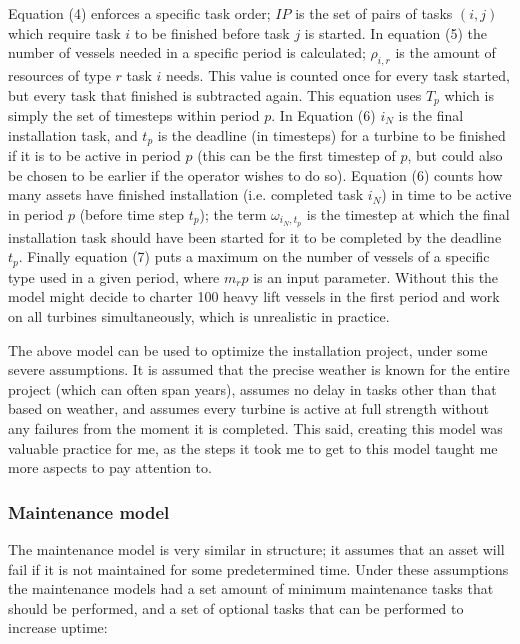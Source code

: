 \documentclass[a4paper,12pt]{article}
\begin{document}
Equation (4) enforces a specific task order; $IP$ is the set of pairs of tasks $(i, j)$ which require task $i$ to be finished before task $j$ is started. In equation (5) the number of vessels needed in a specific period is calculated; $\rho_{i,r}$ is the amount of resources of type $r$ task $i$ needs. This value is counted once for every task started, but every task that finished is subtracted again. This equation uses $T_p$ which is simply the set of timesteps within period $p$. In Equation (6) $i_N$ is the final installation task, and $t_p$ is the deadline (in timesteps) for a turbine to be finished if it is to be active in period $p$ (this can be the first timestep of $p$, but could also be chosen to be earlier if the operator wishes to do so). Equation (6) counts how many assets have finished installation (i.e. completed task $i_N$) in time to be active in period $p$ (before time step $t_p$); the term $\omega_{i_N,t_p}$ is the timestep at which the final installation task should have been started for it to be completed by the deadline $t_p$. Finally equation (7) puts a maximum on the number of vessels of a specific type used in a given period, where $m_rp$ is an input parameter. Without this the model might decide to charter 100 heavy lift vessels in the first period and work on all turbines simultaneously, which is unrealistic in practice. 

\bigskip

The above model can be used to optimize the installation project, under some severe assumptions. It is assumed that the precise weather is known for the entire project (which can often span years), assumes no delay in tasks other than that based on weather, and assumes every turbine is active at full strength without any failures from the moment it is completed. This said, creating this model was valuable practice for me, as the steps it took me to get to this model taught me more aspects to pay attention to. 

\subsubsection{Maintenance model}
The maintenance model is very similar in structure; it assumes that an asset will fail if it is not maintained for some predetermined time. Under these assumptions the maintenance models had a set amount of minimum maintenance tasks that should be performed, and a set of optional tasks that can be performed to increase uptime:
\end{document}
